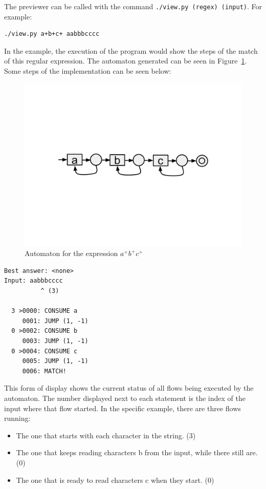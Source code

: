 \documentclass{llncs}
\begin{document}
The previewer can be called with the command \texttt{./view.py (regex) (input)}. For example: 

\begin{verbatim}
./view.py a+b+c+ aabbbcccc
\end{verbatim}

In the example, the execution of the program would show the steps of the match of this regular expression. The automaton generated can be seen in Figure~\ref {fig:view_automaton}. Some steps of the implementation can be seen below: 

\begin{figure}[!htbp]
  \centering
  \includegraphics[trim=3.5in 4in 3.5in 4in, scale=0.3]{figures/view_automaton.pdf}
  \caption{Automaton for the expression $a^+b^+c^+$}
  \label{fig:view_automaton}
\end{figure}

\begin{verbatim}
Best answer: <none>
Input: aabbbcccc
          ^ (3)

  3 >0000: CONSUME a
     0001: JUMP (1, -1)
  0 >0002: CONSUME b
     0003: JUMP (1, -1)
  0 >0004: CONSUME c
     0005: JUMP (1, -1)
     0006: MATCH!
\end{verbatim}

This form of display shows the current status of all flows being executed by the automaton. The number displayed next to each statement is the index of the input where that flow started. In the specific example, there are three flows running: 

\begin{itemize}
\item{The one that starts with each character in the string. (3)}
\item{The one that keeps reading characters b from the input, while there still are. (0)}
\item{The one that is ready to read characters c when they start. (0)}
\end{itemize}
\end{document}
